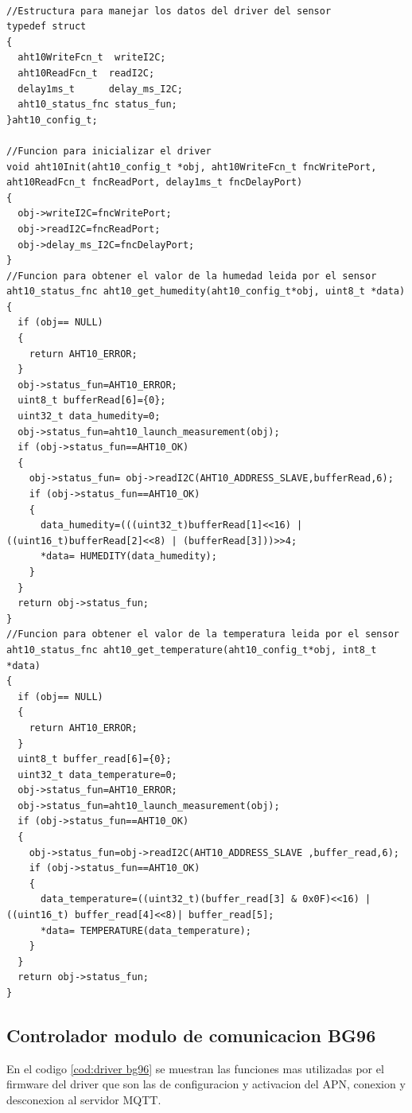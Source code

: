\begin{lstlisting}[label=cod:codigo AHT10,caption=Funciones principales del driver del sensor AHT10.]  % Start your code-block

//Estructura para manejar los datos del driver del sensor    
typedef struct 
{
  aht10WriteFcn_t  writeI2C;
  aht10ReadFcn_t  readI2C;
  delay1ms_t      delay_ms_I2C;    
  aht10_status_fnc status_fun;
}aht10_config_t;

//Funcion para inicializar el driver 
void aht10Init(aht10_config_t *obj, aht10WriteFcn_t fncWritePort, aht10ReadFcn_t fncReadPort, delay1ms_t fncDelayPort)
{
  obj->writeI2C=fncWritePort;
  obj->readI2C=fncReadPort;
  obj->delay_ms_I2C=fncDelayPort;
}
//Funcion para obtener el valor de la humedad leida por el sensor 
aht10_status_fnc aht10_get_humedity(aht10_config_t*obj, uint8_t *data)
{
  if (obj== NULL)
  {
    return AHT10_ERROR;
  }
  obj->status_fun=AHT10_ERROR;
  uint8_t bufferRead[6]={0};
  uint32_t data_humedity=0;
  obj->status_fun=aht10_launch_measurement(obj);
  if (obj->status_fun==AHT10_OK)
  {
    obj->status_fun= obj->readI2C(AHT10_ADDRESS_SLAVE,bufferRead,6);
    if (obj->status_fun==AHT10_OK)
    {
      data_humedity=(((uint32_t)bufferRead[1]<<16) | ((uint16_t)bufferRead[2]<<8) | (bufferRead[3]))>>4;
      *data= HUMEDITY(data_humedity);
    }
  }
  return obj->status_fun;
}
//Funcion para obtener el valor de la temperatura leida por el sensor 
aht10_status_fnc aht10_get_temperature(aht10_config_t*obj, int8_t *data)
{
  if (obj== NULL)
  {
    return AHT10_ERROR;
  } 
  uint8_t buffer_read[6]={0};
  uint32_t data_temperature=0;
  obj->status_fun=AHT10_ERROR;
  obj->status_fun=aht10_launch_measurement(obj);
  if (obj->status_fun==AHT10_OK)
  {
    obj->status_fun=obj->readI2C(AHT10_ADDRESS_SLAVE ,buffer_read,6);
    if (obj->status_fun==AHT10_OK)
    {
      data_temperature=((uint32_t)(buffer_read[3] & 0x0F)<<16) | ((uint16_t) buffer_read[4]<<8)| buffer_read[5];
      *data= TEMPERATURE(data_temperature);
    }
  }
  return obj->status_fun;
}
\end{lstlisting}


\subsection{Controlador modulo de comunicacion BG96 } 
En el codigo \ref{cod:driver bg96} se muestran las funciones mas utilizadas por el firmware del driver que son las de configuracion y activacion del APN, conexion y desconexion al servidor MQTT.


